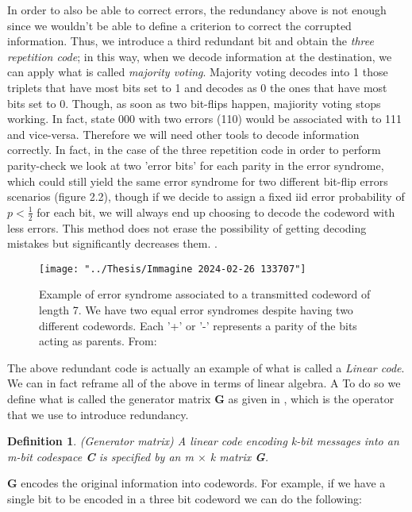 \documentclass{Configuration_Files/PoliMi3i_thesis}
\newtheorem{definition}{Definition}[chapter]
\begin{document}
In order to also be able to correct errors, the redundancy above is not enough since we wouldn't be able to define a criterion to correct the corrupted information. Thus, we introduce a third redundant bit and obtain the {\it three repetition code}; in this way, when we decode information at the destination, we can apply what is called {\it majority voting}. Majority voting decodes into 1 those triplets that have most bits set to 1 and decodes as 0 the ones that have most bits set to 0. Though, as soon as two bit-flips happen, majiority voting stops working. In fact, state 000 with two errors (110) would be associated with to 111 and vice-versa. Therefore we will need other tools to decode information correctly. In fact, in the case of the three repetition code in order to perform parity-check we look at two 'error bits' for each parity in the error syndrome, which could still yield the same error syndrome for two different bit-flip errors scenarios (figure 2.2), though if we decide to assign a fixed iid error probability of $p<\frac{1}{2}$ for each bit, we will always end up choosing to decode the codeword with less errors. This method does not erase the possibility of getting decoding mistakes but significantly decreases them. \cite{Kas19}.\newline


\begin{figure}
	\centering
	\texttt{[image: "../Thesis/Immagine 2024-02-26 133707"]}
	\caption{{ Example of error syndrome associated to a transmitted codeword of length 7. We have two equal error syndromes despite having two different codewords. Each '+' or '-' represents a parity of the bits acting as parents. From: \cite{Kas19}}}
	\label{fig:immagine-2024-02-26-133707}
\end{figure}

The above redundant code is actually an example of what is called a {\it Linear code}.
We can in fact reframe all of the above in terms of linear algebra. A To do so we define what is called the generator matrix  \textbf{G} as given in \cite{Cha06,Kas19}, which is the operator that we use to introduce redundancy. 

\begin{definition}(Generator matrix)
	A linear code encoding k-bit messages into an m-bit codespace \textbf{C} is specified by an m $\times$ k matrix {\bf G}.
\end{definition}

\textbf{G} encodes the original information into { codewords}. For example, if we have a single bit to be encoded in a three bit codeword we can do the following: 
\end{document}
